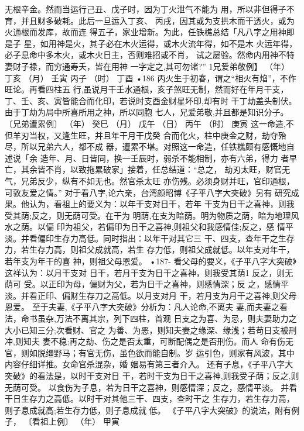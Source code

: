无根辛金。然而当运行己丑、戊子时，因为丁火泄气不能为
用，所以非但得子不育，并且财多破耗。此后一旦运入丁亥、
丙戌，因其或为支拱木而干透火，或为火通根而发库，故而连
得五子，家业增新。为此，任铁樵总结「凡八字之用神即是子
星，如用神是火，其子必在木火运得，或木火流年得，如不是木
火运年得，必子息命中多木火，或木火日主，否则难招或不肖，
试之屡验。然命内用神不特妻财子禄，而穷通寿夭，皆在用神
一字定之,其可勿诸?”
1兄爱弟敬例】
（年） 丁亥
（月） 壬寅
丙子
（时） 丁酉
•186
丙火生于初春，谓之“相火有焰”，不作旺论。再看四柱五
行,虽说月干壬水通根，亥子煞旺无制，然而好在年月干支，
丁、壬、亥、寅皆能合而化印，若说时支酉金财星坏印,却有时
干丁劫盖头制伏。由于丁劫为局中所喜所用之神，所以同胞
七人，兄爱弟敬,并且都是知识分子。
〔兄弟遭累例〕
（年） 癸巳
（月） 戊午
（日） 丙午
（时） 庚寅
这一命造,不但羊刃当权，又逢生旺，并且年干月干戊癸
合而化火，柱中庚金之财，劫夺殆尽，所以兄弟六人，都不成
器，遭累不堪。对照这一命造，任铁樵颇有感慨地自述说「余
造年、月、日皆同，换一壬辰时，弱杀不能相制，亦有六弟，得力
者早亡，其余皆不肖，以致拖累破家」接着，任总结道：“总之，
劫刃太旺，财官无气，兄弟反少，纵有不如无也。然官杀太旺
亦伤残。必须身财并旺，官印通根，可敦友爱之情。”
对于看八字,论六亲，台湾颜昭博《子平八字大突破》另有
研究成果。他认为，看祖上的要义为：以年干支对日干，若年
干支为日干之喜神，则我受其荫;反之，则无荫可受。在干为
明荫,在支为暗荫。明为物质之荫，暗为地理风水之荫。以偏
印为祖父，若偏印为日干之喜神,则祖父和我感情佳;反之，感
情平淡。并看偏印生存力高低。同时指出：以年干对其它三
干、四支，查年干之生存力，若生存力高，则祖父成就高，若生
存力低，则祖父成就低。以年支对年干，若年支为年干的喜
神，则祖父母恩爱。
•187-
看父母的要义，《子平八字大突破》这祥认为：以月干支对
日干，若月干支为日干之喜神，则我受其荫1 反之，则无荫可
受。以正印为母，偏财为父，若为日干之喜神，则感情深；反
之，感情平淡。并看正印、偏财生存刀之高低。以月支对月
干，若月支为月干之喜神,则父母恩爱。
至于夫妻,《子平八字大突破》分析为：凡人论命,不离夫
妻,而夫妻之看法，命书虽杂,万法不离其宗，列下四柱，首观
日支之为喜、为忌，则夫妻助力之大小已知三分;次看财、官之
为善、为恶，则知夫妻之缘深、缘浅；若苟日支被刑冲,则知夫
妻不稳;再之劫、伤之是否太重，可断配偶之是否刑伤。而人
命有伤无官，则如脱缰野马；有官无伤，虽色欲而能自制。岁
运引色，则家有风波，其中内容仔细详推。女命官杀混杂，婚
姻易有第三者介入。
还有子息，《子平八字大突破》的看法是，以时干支对日
干，若时干支为日干之喜神,则我受子荫；反之,则无荫可受。
以食伤为子息，若为日干之喜神，则感情深；反之，感情平淡。
并看干日生存力之高低。以时干对其他三干、四支，查时干之
生存力，若生存力高，则子息成就高;若生存力低，则子息成就
低。
《子平八字大突破》的说法，附有例子，
〔看祖上例〕
（年） 甲寅
